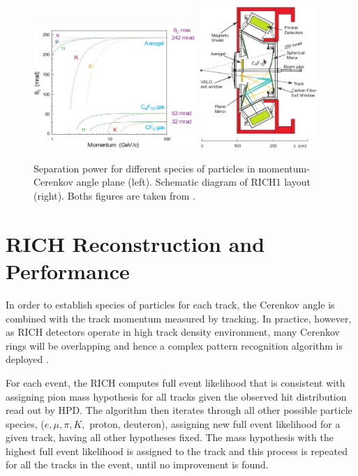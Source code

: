 \begin{figure}[!h]
	\centering
	\includegraphics[width = 0.55\textwidth]{figs/detector/richres1.eps}%
	\includegraphics[width = 0.4\textwidth]{figs/detector/mechrich.eps}%
	\caption{Separation power for different species of particles in momentum-Cerenkov angle plane (left). Schematic diagram of RICH1 layout (right). Boths figures are taken from \cite{det_paper}.}
	\label{fig:richres}
\end{figure}

\section{RICH Reconstruction and Performance}
In order to establish species of particles for each track, the Cerenkov angle is combined with the track momentum measured by tracking. In practice, however, as \Gls{RICH} detectors operate in high track density environment, many Cerenkov rings will be overlapping and hence a complex pattern recognition algorithm is deployed \cite{Forty:1999sg}. 


For each event, the \Gls{RICH} computes full event likelihood that is consistent with assigning pion mass hypothesis for all tracks given the observed hit distribution read out by \Gls{HPD}. The algorithm then iterates through all other possible particle species, ($e, \mu, \pi, K,$ proton, deuteron), assigning new full event likelihood for a given track, having all other hypotheses fixed. The mass hypothesis with the highest full event likelihood is assigned to the track and this process is repeated for all the tracks in the event, until no improvement is found. 

